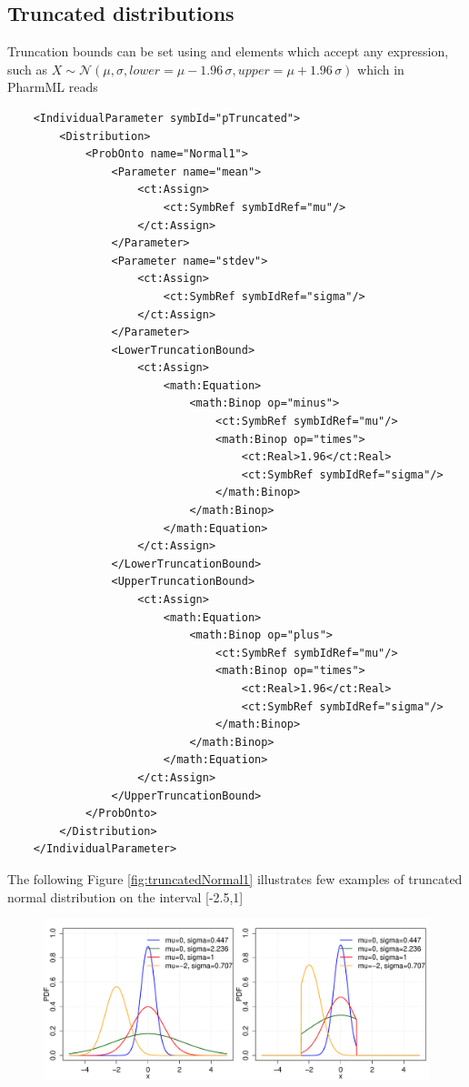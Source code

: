 {\subsection{Truncated distributions}
Truncation bounds can be set using  and 
 elements which accept any expression, such as
$X \sim \mathcal N(\mu,\sigma,lower=\mu-1.96\,\sigma,upper=\mu+1.96\,\sigma)$
which in PharmML reads
\lstset{language=XML}
\begin{lstlisting}
    <IndividualParameter symbId="pTruncated">
        <Distribution>
            <ProbOnto name="Normal1">
                <Parameter name="mean">
                    <ct:Assign>
                        <ct:SymbRef symbIdRef="mu"/>
                    </ct:Assign>
                </Parameter>
                <Parameter name="stdev">
                    <ct:Assign>
                        <ct:SymbRef symbIdRef="sigma"/>
                    </ct:Assign>
                </Parameter>
                <LowerTruncationBound>
                    <ct:Assign>
                        <math:Equation>
                            <math:Binop op="minus">
                                <ct:SymbRef symbIdRef="mu"/>
                                <math:Binop op="times">
                                    <ct:Real>1.96</ct:Real>
                                    <ct:SymbRef symbIdRef="sigma"/>
                                </math:Binop>
                            </math:Binop>
                        </math:Equation>
                    </ct:Assign>
                </LowerTruncationBound>
                <UpperTruncationBound>
                    <ct:Assign>
                        <math:Equation>
                            <math:Binop op="plus">
                                <ct:SymbRef symbIdRef="mu"/>
                                <math:Binop op="times">
                                    <ct:Real>1.96</ct:Real>
                                    <ct:SymbRef symbIdRef="sigma"/>
                                </math:Binop>
                            </math:Binop>
                        </math:Equation>
                    </ct:Assign>
                </UpperTruncationBound>
            </ProbOnto>
        </Distribution>
    </IndividualParameter>
\end{lstlisting}
The following Figure \ref{fig:truncatedNormal1} illustrates few examples of truncated 
normal distribution on the interval [-2.5,1]
\begin{figure}[htb!]
\centering
 \includegraphics[width=140mm]{pics/TruncatedNormal1_pdf.pdf}

\end{figure}}

